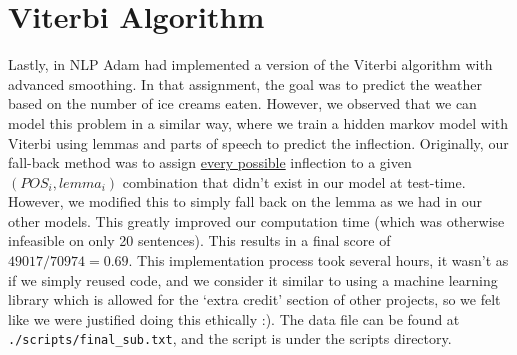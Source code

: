\documentclass{article}
\begin{document}
    \section{Viterbi Algorithm}
        Lastly, in NLP Adam had implemented a version of the Viterbi algorithm with advanced smoothing. In that assignment, the goal was to predict the weather based on the number of ice creams eaten. However,
        we observed that we can model this problem in a similar way, where we train a hidden markov model with Viterbi using lemmas and parts of speech to predict the inflection. Originally, our fall-back method
        was to assign \underline{every possible} inflection to a given $(POS_i, lemma_i)$ combination that didn't exist in our model at test-time. However, we modified this to simply fall back on the
        lemma as we had in our other models. This greatly improved our computation time (which was otherwise infeasible on only 20 sentences). This results in a final score of $\boxed{49017 / 70974 = 0.69}$. This implementation process took several hours, it wasn't as if we 
        simply reused code, and we consider it similar to using a machine learning library which is allowed for the `extra credit' section of other projects, so we felt like we were justified doing this ethically :).
        The data file can be found at \texttt{./scripts/final\_sub.txt}, and the script is under the scripts directory.
\end{document}
